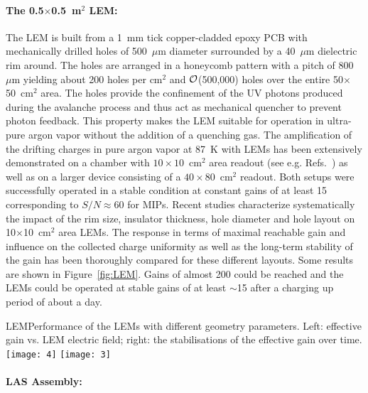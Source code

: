 \paragraph{The 0.5$\times$0.5~m$^2$ LEM:}
The LEM is built from a 1~mm tick copper-cladded epoxy PCB with
mechanically drilled holes of 500~$\mu$m diameter surrounded by a
40~$\mu$m dielectric rim around. The holes are arranged in a honeycomb
pattern with a pitch of 800~$\mu$m yielding about 200 holes per cm$^2$
and $\cal O$(500,000) holes over the entire 50$\times$50~cm$^2$
area. The holes provide the confinement of the UV photons produced
during the avalanche process and thus act as mechanical quencher to
prevent photon feedback. This property makes the LEM suitable for
operation in ultra-pure argon vapor without the addition of a
quenching gas. The amplification of the drifting charges in pure argon
vapor at 87~K with LEMs has been extensively demonstrated on a chamber
with $10\times10$~cm$^2$ area readout (see e.g.
Refs.~\cite{Badertscher:2008rf,Badertscher:2010fi}) as well as on a
larger device consisting of a $40\times80$~cm$^2$
readout\cite{Badertscher:2013wm}.  Both setups were successfully
operated in a stable condition at constant gains of at least 15
corresponding to $S/N\approx 60$ for MIPs. Recent
studies\cite{Cantini:2014xza} characterize systematically the impact
of the rim size, insulator thickness, hole diameter and hole layout on
10$\times$10~cm$^2$ area LEMs. The response in terms of maximal
reachable gain and influence on the collected charge uniformity as
well as the long-term stability of the gain has been thoroughly
compared for these different layouts. Some results are shown in
Figure~\ref{fig:LEM}.  Gains of almost 200 could be reached and the
LEMs could be operated at stable gains of at least $\sim$15 after a
charging up period of about a day.
\begin{cdrfigure}{LEM}{Performance of the LEMs with different geometry parameters. Left: effective gain vs. LEM electric field; right: the stabilisations of the effective gain over time.}
\texttt{[image: 4]}
\texttt{[image: 3]}
\end{cdrfigure}

\paragraph{LAS Assembly:}

